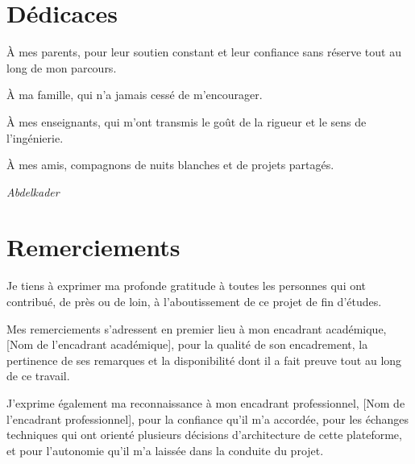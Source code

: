 \documentclass[12pt,a4paper,twoside,openright]{report}
\makeatletter
\def\cleardoublepage{\clearpage\if@twoside
  \ifodd\c@page\else\hbox{}\thispagestyle{empty}\newpage\fi\fi}
\newcommand{\encadrantacad}{[Nom de l'encadrant académique]}
\newcommand{\encadrantpro}{[Nom de l'encadrant professionnel]}
\makeatother
\begin{document}
\chapter*{Dédicaces}
\vspace{1cm}
\begin{center}
\begin{minipage}{0.78\textwidth}
\itshape\large

À mes parents, pour leur soutien constant et leur confiance sans réserve tout au long
de mon parcours.

\vspace{0.8cm}
À ma famille, qui n'a jamais cessé de m'encourager.

\vspace{0.8cm}
À mes enseignants, qui m'ont transmis le goût de la rigueur et le sens de l'ingénierie.

\vspace{0.8cm}
À mes amis, compagnons de nuits blanches et de projets partagés.

\vspace{1.2cm}
\hfill\normalsize\upshape\textit{Abdelkader}
\end{minipage}
\end{center}

\cleardoublepage

\chapter*{Remerciements}

Je tiens à exprimer ma profonde gratitude à toutes les personnes qui ont contribué,
de près ou de loin, à l'aboutissement de ce projet de fin d'études.

Mes remerciements s'adressent en premier lieu à mon encadrant académique,
\encadrantacad, pour la qualité de son encadrement, la pertinence de ses remarques
et la disponibilité dont il a fait preuve tout au long de ce travail.

J'exprime également ma reconnaissance à mon encadrant professionnel,
\encadrantpro, pour la confiance qu'il m'a accordée, pour les échanges techniques
qui ont orienté plusieurs décisions d'architecture de cette plateforme, et pour
l'autonomie qu'il m'a laissée dans la conduite du projet.
\end{document}
